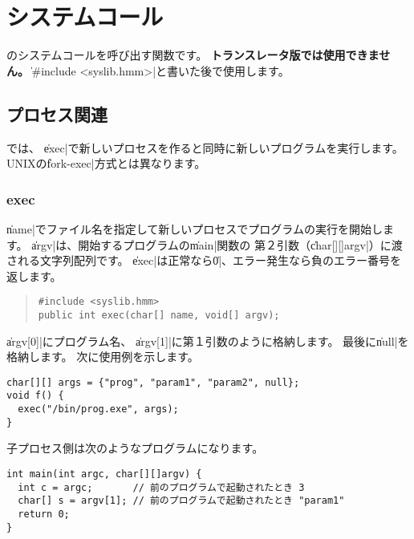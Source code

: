 % 
%
\chapter{システムコール}

\tacos のシステムコールを呼び出す関数です。
{\bf トランスレータ版では使用できません。}
\|#include <syslib.hmm>|と書いた後で使用します。

\section{プロセス関連}

\tacos では、
\|exec|で新しいプロセスを作ると同時に新しいプログラムを実行します。
UNIXの\|fork-exec|方式とは異なります。


\subsection{exec}

\|name|でファイル名を指定して新しいプロセスでプログラムの実行を開始します。
\|argv|は、開始するプログラムの\|main|関数の
第２引数（\|char[][]argv|）に渡される文字列配列です。
\|exec|は正常なら\|0|、エラー発生なら負のエラー番号を返します。

\begin{quote}
\begin{verbatim}
#include <syslib.hmm>
public int exec(char[] name, void[] argv);
\end{verbatim}
\end{quote}

\|argv[0]|にプログラム名、
\|argv[1]|に第１引数のように格納します。
最後に\|null|を格納します。
次に使用例を示します。

\begin{mylist}
\begin{verbatim}
char[][] args = {"prog", "param1", "param2", null};
void f() {
  exec("/bin/prog.exe", args);
}
\end{verbatim}
\end{mylist}

子プロセス側は次のようなプログラムになります。

\begin{mylist}
\begin{verbatim}
int main(int argc, char[][]argv) {
  int c = argc;       // 前のプログラムで起動されたとき 3
  char[] s = argv[1]; // 前のプログラムで起動されたとき "param1"
  return 0;
}
\end{verbatim}
\end{mylist}

